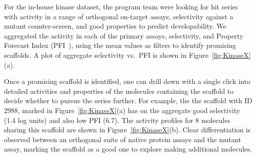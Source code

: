 \documentclass[journal=jacsat,biochem,manuscript=article]{achemso}
\newcommand*\fref[1]{Figure~\ref{fig:#1}}
\newcommand*\vs{vs.~}
\begin{document}
For the in-house kinase dataset, the program team were looking for hit series with activity in a range of orthogonal on-target assays, selectivity against a mutant counter-screen, and good properties to predict developability.  We aggregated the activity in each of the primary assays, selectivity, and Property Forecast Index (PFI~\cite{Young2011}), using the mean values as filters to identify promising scaffolds.  A plot of aggregate selectivity \vs PFI is shown in \fref{KinaseX}(a).

Once a promising scaffold is identified, one can drill down with a single click into detailed activities and properties of the molecules containing the scaffold to decide whether to pursue the series further. For example, the
the scaffold with ID 2988, marked in \fref{KinaseX}(a) has on the aggregate good selectivity (1.4 log units) and also low PFI (6.7). The activity profiles for 8
molecules sharing this scaffold are shown in \fref{KinaseX}(b). Clear differentiation is observed between an orthogonal suite of native protein assays and the mutant assay, marking the scaffold as a good one to explore making additional molecules.
\end{document}
